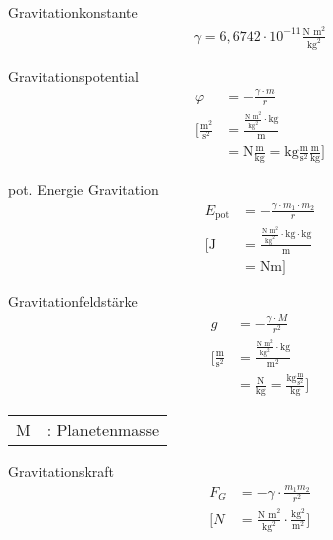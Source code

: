\begin{karte}{Gravitationkonstante}
    \begin{align*}
        \gamma = 6,6742 \cdot 10^{-11} \frac{\text{N m}^2}{\text{kg}^2}
    \end{align*}
\end{karte}

\begin{karte}{Gravitationspotential}
    \begin{align*}
        \varphi &= - \frac{\gamma \cdot m }{r} \\
        \bigg[ \frac{\text{m}^2}{\text{s}^2} &= \frac{\frac{\text{N m}^2}{\text{kg}^2} \cdot \text{kg}}{\text{m}} \\
            &= \text{N}\frac{\text{m}}{\text{kg}} = \text{kg}\frac{\text{m}}{\text{s}^2}\frac{\text{m}}{\text{kg}} 
            \bigg]
    \end{align*}
\end{karte}

\begin{karte}{pot. Energie Gravitation}
    \begin{align*}
        E_\text{pot} &= - \frac{\gamma \cdot m_1 \cdot m_2}{r}\\
        \bigg[ \text{J} &= \frac{\frac{\text{N m}^2}{\text{kg}^2} \cdot \text{kg} \cdot \text{kg}}{\text{m}} \\
            &= \text{Nm} \bigg]
    \end{align*}
\end{karte}

\begin{karte}{Gravitationfeldstärke}
    \begin{align*}
        g &= - \frac{ \gamma \cdot M }{r^2} \\
        \bigg[ \frac{\text{m}}{\text{s}^2} &= \frac{\frac{\text{N m}^2}{\text{kg}^2} \cdot \text{kg}}{\text{m}^2} \\
            &= \frac{\text{N}}{\text{kg}} = \frac{\text{kg}\frac{\text{m}}{\text{s}^2}}{\text{kg}}
            \bigg]
    \end{align*}
    \begin{tabular}[t]{cl}
        M &: Planetenmasse
    \end{tabular}
\end{karte}

\begin{karte}{Gravitationskraft}
    \begin{align*}
        F_G &= - \gamma \cdot \frac{m_1m_2}{r^2} \\
        \bigg[ N &= \frac{\text{N m}^2}{\text{kg}^2} \cdot \frac{\text{kg}^2}{\text{m}^2} \bigg]
    \end{align*}
\end{karte}

